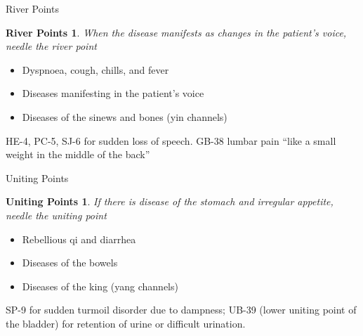 \begin{frame}{River Points}
\newtheorem{river}{River Points}
\begin{river}
When the disease manifests as changes in the patient's voice, needle the river point
\end{river}

\begin{itemize}
\item Dyspnoea, cough, chills, and fever
\item Diseases manifesting in the patient's voice
\item Diseases of the sinews and bones (yin channels) 
\end{itemize}

\vspace{0.5em}

HE-4, PC-5, SJ-6 for sudden loss of speech. GB-38 lumbar pain ``like a small weight in the middle of the back'' 

\end{frame}

\begin{frame}{Uniting Points}
\newtheorem{unite}{Uniting Points}
\begin{unite}
If there is disease of the stomach and irregular appetite, needle the uniting point
\end{unite}

\begin{itemize}
\item Rebellious qi and diarrhea
\item Diseases of the bowels
\item Diseases of the king (yang channels) 
\end{itemize}

\vspace{0.5em}

SP-9 for sudden turmoil disorder due to dampness; UB-39 (lower uniting point of the bladder) for retention of urine or difficult urination. 
\end{frame}

